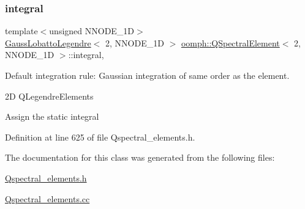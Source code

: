 \subsubsection{\texorpdfstring{integral}{integral}}
{\footnotesize\ttfamily template$<$unsigned N\+N\+O\+D\+E\+\_\+1D$>$ \\
\hyperlink{classoomph_1_1GaussLobattoLegendre}{Gauss\+Lobatto\+Legendre}$<$ 2, N\+N\+O\+D\+E\+\_\+1D $>$ \hyperlink{classoomph_1_1QSpectralElement}{oomph\+::\+Q\+Spectral\+Element}$<$ 2, N\+N\+O\+D\+E\+\_\+1D $>$\+::integral\hspace{0.3cm}{\ttfamily [static]}, {\ttfamily [private]}}



Default integration rule\+: Gaussian integration of same \textquotesingle{}order\textquotesingle{} as the element. 

2D Q\+Legendre\+Elements

Assign the static integral 

Definition at line 625 of file Qspectral\+\_\+elements.\+h.



The documentation for this class was generated from the following files\+:\begin{DoxyCompactItemize}
\item 
\hyperlink{Qspectral__elements_8h}{Qspectral\+\_\+elements.\+h}\item 
\hyperlink{Qspectral__elements_8cc}{Qspectral\+\_\+elements.\+cc}\end{DoxyCompactItemize}
